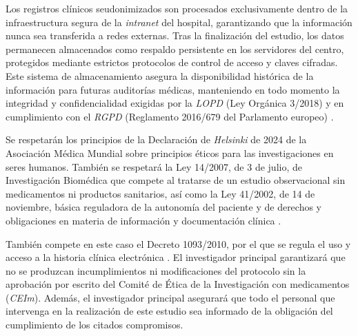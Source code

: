 Los registros clínicos seudonimizados son procesados exclusivamente dentro de la infraestructura segura de la \textit{intranet} del hospital, garantizando que la información nunca sea transferida a redes externas. Tras la finalización del estudio, los datos permanecen almacenados como respaldo persistente en los servidores del centro, protegidos mediante estrictos protocolos de control de acceso y claves cifradas. Este sistema de almacenamiento asegura la disponibilidad histórica de la información para futuras auditorías médicas, manteniendo en todo momento la integridad y confidencialidad exigidas por la \textit{LOPD} (Ley Orgánica 3/2018) \cite{boe2018/3} y en cumplimiento con el \textit{RGPD} (Reglamento 2016/679 del Parlamento europeo) \cite{boe2016/679}.

Se respetarán los principios de la Declaración de \textit{Helsinki} de 2024 de la Asociación Médica Mundial sobre principios éticos para las investigaciones en seres humanos. También se respetará la Ley 14/2007, de 3 de julio, de Investigación Biomédica que compete al tratarse de un estudio observacional sin medicamentos ni productos sanitarios, \cite{boe2007/14} así como la Ley 41/2002, de 14 de noviembre, básica reguladora de la autonomía del paciente y de derechos y obligaciones en materia de información y documentación clínica \cite{boe2002/41}.

También compete en este caso el Decreto 1093/2010, por el que se regula el uso y acceso a la historia clínica electrónica \cite{boe2010/1093}. El investigador principal garantizará que no se produzcan incumplimientos ni modificaciones del protocolo sin la aprobación por escrito del Comité de Ética de la Investigación con medicamentos (\textit{CEIm}). Además, el investigador principal asegurará que todo el personal que intervenga en la realización de este estudio sea informado de la obligación del cumplimiento de los citados compromisos.

